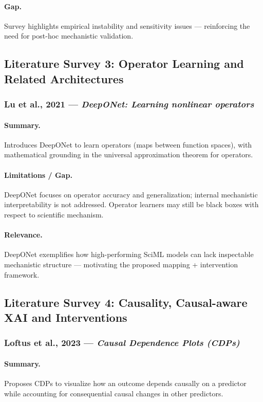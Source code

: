 \documentclass[12pt,singleside,a4paper]{article}
\begin{document}
\paragraph{Gap.}
Survey highlights empirical instability and sensitivity issues — reinforcing the need for post-hoc mechanistic validation. 

\subsection{Literature Survey 3: Operator Learning and Related Architectures}

\subsubsection{Lu et al., 2021 — \textit{DeepONet: Learning nonlinear operators}}
\paragraph{Summary.}
Introduces DeepONet to learn operators (maps between function spaces), with mathematical grounding in the universal approximation theorem for operators.  
\paragraph{Limitations / Gap.}
DeepONet focuses on operator accuracy and generalization; internal mechanistic interpretability is not addressed. Operator learners may still be black boxes with respect to scientific mechanism.  
\paragraph{Relevance.}
DeepONet exemplifies how high-performing SciML models can lack inspectable mechanistic structure — motivating the proposed mapping + intervention framework. 
\subsection{Literature Survey 4: Causality, Causal-aware XAI and Interventions}

\subsubsection{Loftus et al., 2023 — \textit{Causal Dependence Plots (CDPs)}}
\paragraph{Summary.}
Proposes CDPs to visualize how an outcome depends causally on a predictor while accounting for consequential causal changes in other predictors.  
\end{document}
